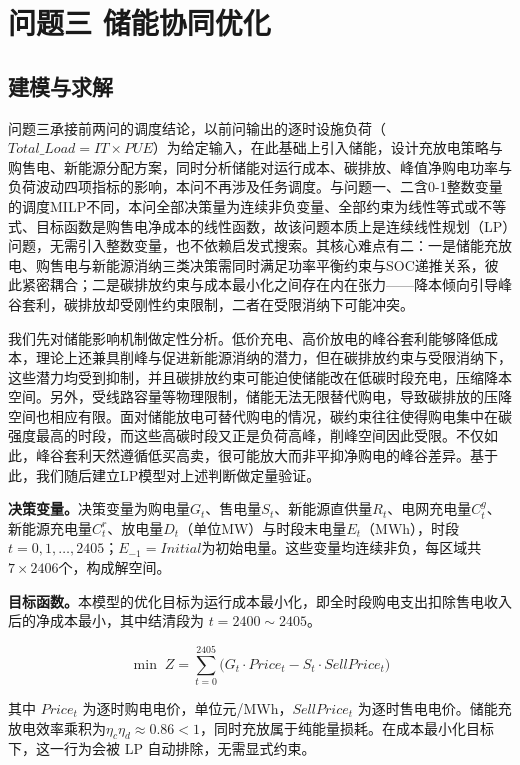 \section{问题三 储能协同优化}

\subsection{建模与求解}

问题三承接前两问的调度结论，以前问输出的逐时设施负荷（$Total\_Load=IT\times PUE$）为给定输入，在此基础上引入储能，设计充放电策略与购售电、新能源分配方案，同时分析储能对运行成本、碳排放、峰值净购电功率与负荷波动四项指标的影响，本问不再涉及任务调度。与问题一、二含0-1整数变量的调度MILP不同，本问全部决策量为连续非负变量、全部约束为线性等式或不等式、目标函数是购售电净成本的线性函数，故该问题本质上是连续线性规划（LP）问题，无需引入整数变量，也不依赖启发式搜索。其核心难点有二：一是储能充放电、购售电与新能源消纳三类决策需同时满足功率平衡约束与SOC递推关系，彼此紧密耦合；二是碳排放约束与成本最小化之间存在内在张力——降本倾向引导峰谷套利，碳排放却受刚性约束限制，二者在受限消纳下可能冲突。

我们先对储能影响机制做定性分析。低价充电、高价放电的峰谷套利能够降低成本，理论上还兼具削峰与促进新能源消纳的潜力，但在碳排放约束与受限消纳下，这些潜力均受到抑制，并且碳排放约束可能迫使储能改在低碳时段充电，压缩降本空间。另外，受线路容量等物理限制，储能无法无限替代购电，导致碳排放的压降空间也相应有限。面对储能放电可替代购电的情况，碳约束往往使得购电集中在碳强度最高的时段，而这些高碳时段又正是负荷高峰，削峰空间因此受限。不仅如此，峰谷套利天然遵循低买高卖，很可能放大而非平抑净购电的峰谷差异。基于此，我们随后建立LP模型对上述判断做定量验证。

\medskip\noindent\textbf{决策变量。}决策变量为购电量$G_t$、售电量$S_t$、新能源直供量$R_t$、电网充电量$C^g_t$、新能源充电量$C^r_t$、放电量$D_t$（单位MW）与时段末电量$E_t$（MWh），时段$t=0,1,\ldots,2405$；$E_{-1}=Initial$为初始电量。这些变量均连续非负，每区域共$7\times2406$个，构成解空间。

\medskip\noindent\textbf{目标函数。}本模型的优化目标为运行成本最小化，即全时段购电支出扣除售电收入后的净成本最小，其中结清段为 $t=2400\sim2405$。

\begin{equation}
\min \; Z = \sum_{t=0}^{2405} \bigl(G_t \cdot Price_t - S_t \cdot SellPrice_t\bigr)
\end{equation}

其中 $Price_t$ 为逐时购电电价，单位元/MWh，$SellPrice_t$ 为逐时售电电价。储能充放电效率乘积为$\eta_c\eta_d\approx0.86<1$，同时充放属于纯能量损耗。在成本最小化目标下，这一行为会被 LP 自动排除，无需显式约束。

